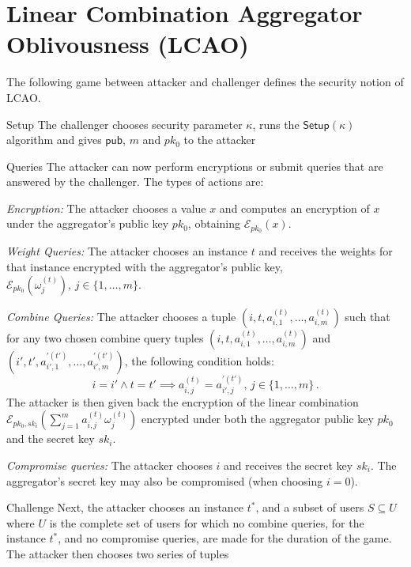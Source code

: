 \documentclass[10pt,letterpaper,oneside,twocolumn,journal]{IEEEtran}
\theoremstyle{definition}
\theoremstyle{definition}
\theoremstyle{remark}
\begin{document}
\section{Linear Combination Aggregator Oblivousness (LCAO)} \label{app:lcao}
The following game between attacker and challenger defines the security notion of LCAO.
\begin{LaTeXdescription}
    \item[Setup] The challenger chooses security parameter $\kappa$, runs the $\mathsf{Setup}(\kappa)$ algorithm and gives $\mathsf{pub}$, $m$ and $pk_0$ to the attacker
    \item[Queries] The attacker can now perform encryptions or submit queries that are answered by the challenger. The types of actions are:
    \begin{LaTeXenumerate}
        \item \textit{Encryption:} The attacker chooses a value $x$ and computes an encryption of $x$ under the aggregator's public key $pk_0$, obtaining $\mathcal{E}_{pk_0}(x)$.
        \item \textit{Weight Queries:} The attacker chooses an instance $t$ and receives the weights for that instance encrypted with the aggregator's public key, $\mathcal{E}_{pk_0}(\omega^{(t)}_{j}),\,j\in\{1,\dots,m\}$.
        \item \textit{Combine Queries:} The attacker chooses a tuple $(i,t,a^{(t)}_{i,1},\dots,a^{(t)}_{i,m})$ such that for any two chosen combine query tuples $(i,t,a^{(t)}_{i,1},\dots,a^{(t)}_{i,m})$ and $(i',t',a^{\prime(t')}_{i',1},\dots,a^{\prime(t')}_{i',m})$, the following condition holds:
        \begin{equation*}
            i = i' \wedge t = t' \implies a^{(t)}_{i,j} = a^{\prime(t')}_{i',j},\,j\in\{1,\dots,m\}\,.
        \end{equation*}
        The attacker is then given back the encryption of the linear combination $\mathcal{E}_{pk_0,sk_i}(\sum^m_{j=1}a^{(t)}_{i,j}\omega^{(t)}_j)$ encrypted under both the aggregator public key $pk_0$ and the secret key $sk_i$.
        \item \textit{Compromise queries:} The attacker chooses $i$ and receives the secret key $sk_i$. The aggregator's secret key may also be compromised (when choosing $i=0$).
    \end{LaTeXenumerate} 
    \item[Challenge] Next, the attacker chooses an instance $t^*$, and a subset of users $S \subseteq U$ where $U$ is the complete set of users for which no combine queries, for the instance $t^*$, and no compromise queries, are made for the duration of the game. The attacker then chooses two series of tuples

\end{LaTeXdescription}
\end{document}
